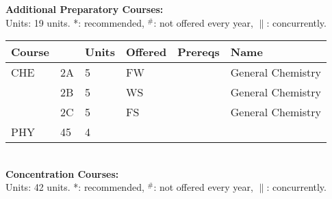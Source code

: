 \documentclass[12pt]{article}
\begin{document}
\newpage
{}
\vskip 0.25cm
\noindent
{\bf Additional Preparatory Courses:  }\\
Units:  19 units. *: recommended, $^\#$: not offered every year, $\parallel$: concurrently.\\
\begin{tabular}{|llllll|}
\hline
Course & & Units & Offered & Prereqs & Name \\
\hline
\hline
CHE  & 2A      & 5 & FW & & General Chemistry \\
     & 2B      & 5 & WS & & General Chemistry \\
     & 2C      & 5 & FS & & General Chemistry \\
PHY  & 45      & 4 & & & \\
\hline
\end{tabular}\\
\vskip 0.25cm
\noindent
{\bf Concentration Courses:  }\\
Units:  42 units. *: recommended, $^\#$: not offered every year, $\parallel$: concurrently.\\
\end{document}
